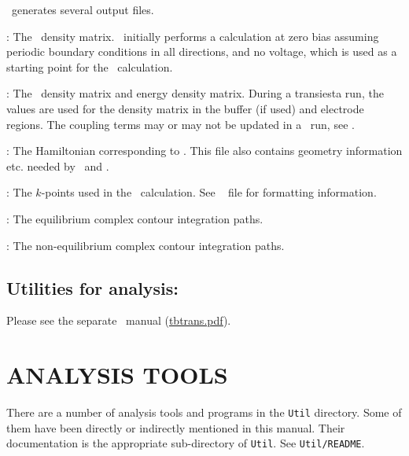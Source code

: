 \tsiesta\ generates several output files.  
\begin{description}
  \itemsep 10pt
  \parsep 0pt
  
  \item[\sysfile{DM}]: The \siesta\ density matrix. \siesta\ initially
  performs a calculation at zero bias assuming periodic boundary conditions in all
  directions, and no voltage, which is used as a starting point for the \tsiesta\
  calculation.
  
  \item[\sysfile{TSDE}]: The \tsiesta\ density matrix and energy
  density matrix. During a transiesta run, the \sysfile{DM} values are
  used for the density matrix in the buffer (if used) and electrode
  regions. The coupling terms may or may not be updated in a \tsiesta\
  run, see .
  
  \item[\sysfile{TSHS}]: The Hamiltonian corresponding to
  . This file also contains geometry information
  etc. needed by \tsiesta\ and \tbtrans.

  \item[\sysfile{TSKP}]: The $k$-points used in the \tsiesta\ calculation. See
  \siesta\  file for formatting information.

  \item[\sysfile{TSCCEQ*}]: The equilibrium complex contour integration paths.

  \item[\sysfile{TSCCNEQ*}]: The non-equilibrium complex contour
  integration paths.

\end{description} 

\subsection{Utilities for analysis:
    \texorpdfstring{\tbtrans}{TBtrans}} 
\index{tbtrans@\textbf{tbtrans}}

Please see the separate \tbtrans\ manual
(\href{run:tbtrans.pdf}{tbtrans.pdf}).

\section{ANALYSIS TOOLS}

There are a number of analysis tools and programs in the \texttt{Util}
directory. Some of them have been directly or indirectly mentioned in
this manual. Their documentation is the appropriate sub-directory of
\texttt{Util}. See \texttt{Util/README}.

